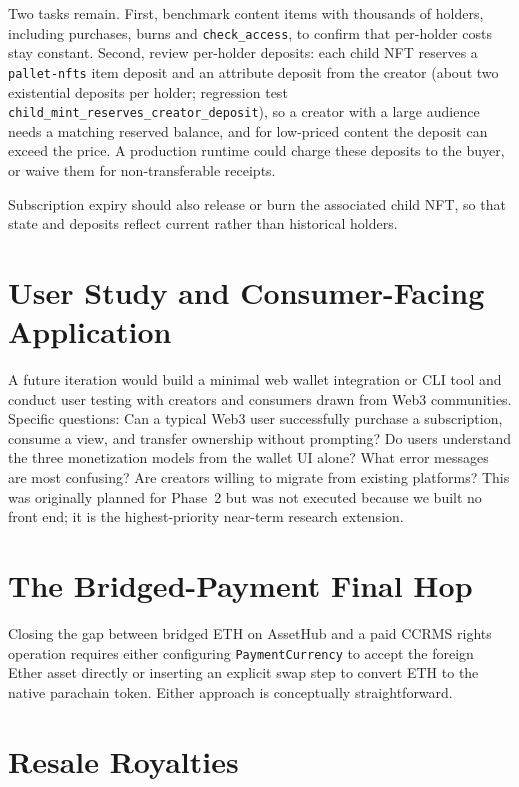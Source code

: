 Two tasks remain. First, benchmark content items with thousands of holders, including purchases, burns and \texttt{check\_access}, to confirm that per-holder costs stay constant. Second, review per-holder deposits: each child NFT reserves a \texttt{pallet-nfts} item deposit and an attribute deposit from the creator (about two existential deposits per holder; regression test \texttt{child\_mint\_reserves\_creator\_deposit}), so a creator with a large audience needs a matching reserved balance, and for low-priced content the deposit can exceed the price. A production runtime could charge these deposits to the buyer, or waive them for non-transferable receipts.

Subscription expiry should also release or burn the associated child NFT, so that state and deposits reflect current rather than historical holders.

\section[User Study and Consumer Application]{User Study and Consumer-Facing Application}\label{sec:e-user-study}

A future iteration would build a minimal web wallet integration or CLI tool and conduct user testing with creators and consumers drawn from Web3 communities. Specific questions: Can a typical Web3 user successfully purchase a subscription, consume a view, and transfer ownership without prompting? Do users understand the three monetization models from the wallet UI alone? What error messages are most confusing? Are creators willing to migrate from existing platforms? This was originally planned for Phase~2 but was not executed because we built no front end; it is the highest-priority near-term research extension.

\section{The Bridged-Payment Final Hop}\label{sec:e-bridged-payment}

Closing the gap between bridged ETH on AssetHub and a paid CCRMS rights operation requires either configuring \texttt{PaymentCurrency} to accept the foreign Ether asset directly or inserting an explicit swap step to convert ETH to the native parachain token. Either approach is conceptually straightforward.

\section{Resale Royalties}\label{sec:e-resale-royalties}

